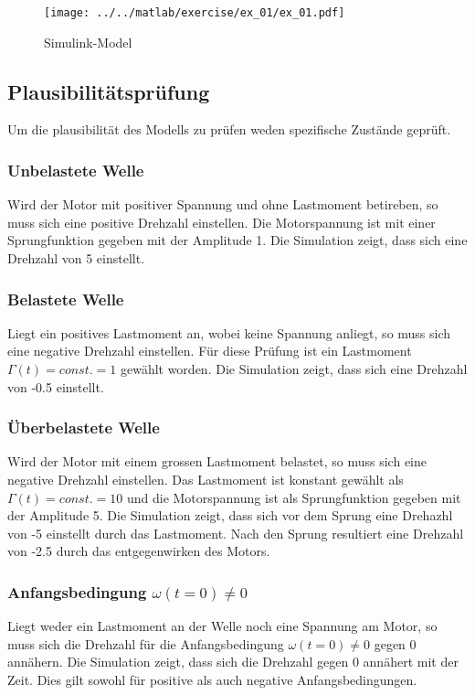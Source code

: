 

\begin{figure}[h!]
	\centering
	\texttt{[image: ../../matlab/exercise/ex\_01/ex\_01.pdf]}
	\caption{Simulink-Model}
\end{figure}

\subsection{Plausibilitätsprüfung}
Um die plausibilität des Modells zu prüfen weden spezifische Zustände geprüft.

\subsubsection{Unbelastete Welle}
Wird der Motor mit positiver Spannung und ohne Lastmoment betireben, so muss
sich eine positive Drehzahl einstellen. Die Motorspannung ist mit einer
Sprungfunktion gegeben mit der Amplitude 1. Die Simulation zeigt, dass sich
eine Drehzahl von 5 einstellt.

\subsubsection{Belastete Welle}
Liegt ein positives Lastmoment an, wobei keine Spannung anliegt, so muss sich
eine negative Drehzahl einstellen. Für diese Prüfung ist ein Lastmoment
$\Gamma(t) = const. = 1$ gewählt worden. Die Simulation zeigt, dass sich eine
Drehzahl von -0.5 einstellt.

\subsubsection{Überbelastete Welle}
Wird der Motor mit einem grossen Lastmoment belastet, so muss sich eine
negative Drehzahl einstellen. Das Lastmoment ist konstant gewählt als
$\Gamma(t) = const. = 10$ und die Motorspannung ist als Sprungfunktion
gegeben mit der Amplitude 5. Die Simulation zeigt, dass sich vor dem Sprung
eine Drehazhl von -5 einstellt durch das Lastmoment. Nach den Sprung
resultiert eine Drehzahl von -2.5 durch das entgegenwirken des Motors.

\subsubsection{Anfangsbedingung $\omega(t=0) \neq 0$}
Liegt weder ein Lastmoment an der Welle noch eine Spannung am Motor, so muss
sich die Drehzahl für die Anfangsbedingung $\omega(t=0) \neq 0$ gegen 0
annähern. Die Simulation zeigt, dass sich die Drehzahl gegen 0 annähert mit
der Zeit. Dies gilt sowohl für positive als auch negative Anfangsbedingungen.

